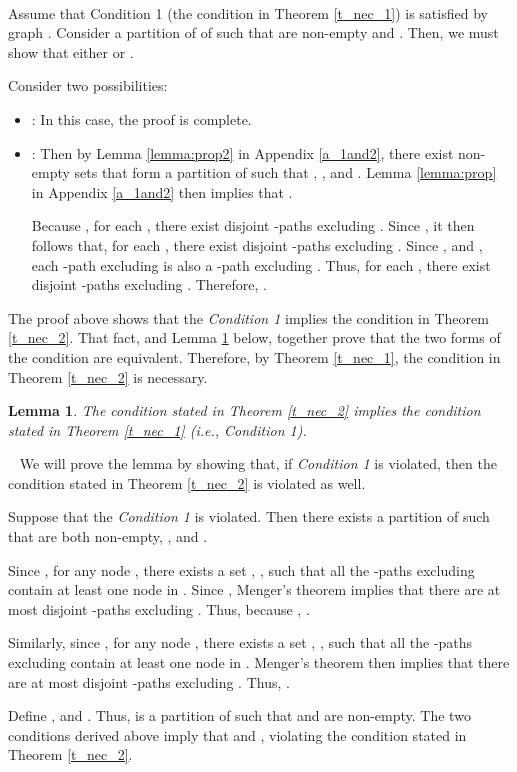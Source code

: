 \documentclass[letterpaper, 11pt]{article}
\newenvironment{proof}{\noindent {\bf Proof:}~}{\hspace*{\fill}}
\newtheorem{lemma}{Lemma}
\begin{document}
\begin{proof}

Assume that Condition 1 (the condition in Theorem \ref{t_nec_1}) is satisfied by graph
. Consider a partition of  of  such that
 are non-empty and .
Then, we must show that either 
or .

\noindent
Consider two possibilities:
\begin{itemize}
\item : In this case, the proof is complete.
\item :
Then by Lemma \ref{lemma:prop2} in Appendix \ref{a_1and2}, there exist non-empty sets 
that form a partition of  such that
, , and .
Lemma \ref{lemma:prop} in Appendix \ref{a_1and2} then implies that .



Because ,
for each , there exist  disjoint -paths excluding .
Since , it then follows that,
for each , there exist  disjoint -paths excluding .
Since , and , each -path excluding  is also a
-path excluding . Thus, 
for each , there exist  disjoint -paths excluding .
Therefore, .

\end{itemize}
\end{proof}



The proof above shows that
the {\em Condition 1} implies the condition
in Theorem \ref{t_nec_2}. That fact, and Lemma \ref{lemma:nec2-to-1} below,
together prove that the two forms of the condition are equivalent. Therefore, by Theorem \ref{t_nec_1}, the condition in Theorem \ref{t_nec_2} is necessary.

\begin{lemma}
\label{lemma:nec2-to-1}
The condition stated in Theorem \ref{t_nec_2} implies the condition stated in Theorem \ref{t_nec_1} (i.e., {\em Condition 1}).
\end{lemma}
\begin{proof}
We will prove the lemma by showing that, if {\em Condition 1} is violated, then the condition stated in Theorem \ref{t_nec_2}
is violated as well. 

Suppose that the {\em Condition 1} is violated. Then there exists a partition  of  such that  are both non-empty, ,  and .

Since , for any node , there exists a set , , such that all the -paths excluding  contain at least one node in . Since , Menger's theorem \cite{Graph_theory_west} implies that there are at most  disjoint  -paths excluding .  Thus, because , . 

Similarly, since , for any node , there exists a set , , such that all the -paths excluding   contain at least one node in . Menger's theorem \cite{Graph_theory_west} then implies that there are at most  disjoint -paths excluding .  Thus, .

Define , and . Thus,  is a partition of  such that  and  are non-empty. The two conditions derived above imply that
 and ,  violating the condition stated in Theorem \ref{t_nec_2}.
\end{proof}
\end{document}

